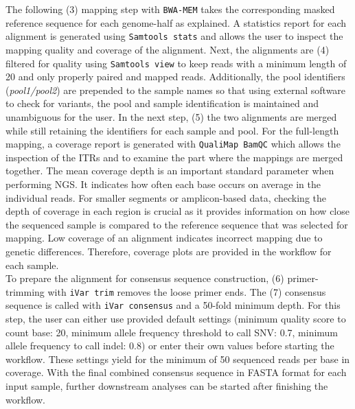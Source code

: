 The following (3) mapping step with \texttt{BWA-MEM} takes the corresponding masked reference sequence for each genome-half as explained. A statistics report for each alignment is generated using \texttt{Samtools stats} and allows the user to inspect the mapping quality and coverage of the alignment. Next, the alignments are (4) filtered for quality using \texttt{Samtools view} to keep reads with a minimum length of 20 and only properly paired and mapped reads. Additionally, the pool identifiers (\textit{pool1/pool2}) are prepended to the sample names so that using external software to check for variants, the pool and sample identification is maintained and unambiguous for the user. In the next step, (5) the two alignments are merged while still retaining the identifiers for each sample and pool. For the full-length mapping, a coverage report is generated with \texttt{QualiMap BamQC} which allows the inspection of the \acp{ITR} and to examine the part where the mappings are merged together. The mean coverage depth is an important standard parameter when performing \ac{NGS}. It indicates how often each base occurs on average in the individual reads. For smaller segments or amplicon-based data, checking the depth of coverage in each region is crucial as it provides information on how close the sequenced sample is compared to the reference sequence that was selected for mapping. Low coverage of an alignment indicates incorrect mapping due to genetic differences. Therefore, coverage plots are provided in the workflow for each sample. \\
To prepare the alignment for consensus sequence construction, (6) primer-trimming with \texttt{iVar trim} removes the loose primer ends. The (7) consensus sequence is called with \texttt{iVar consensus} and a 50-fold minimum depth. For this step, the user can either use provided default settings (minimum quality score to count base: 20, minimum allele frequency threshold to call \ac{SNV}: 0.7, minimum allele frequency to call indel: 0.8) or enter their own values before starting the workflow. These settings yield for the minimum of 50 sequenced reads per base in coverage. With the final combined consensus sequence in FASTA format for each input sample, further downstream analyses can be started after finishing the workflow.

